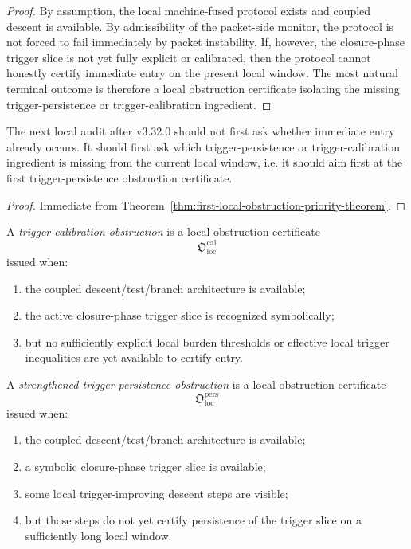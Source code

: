 \begin{proof}
By assumption, the local machine-fused protocol exists and coupled descent is available.
By admissibility of the packet-side monitor, the protocol is not forced to fail immediately by packet instability.
If, however, the closure-phase trigger slice is not yet fully explicit or calibrated, then the protocol cannot honestly certify immediate entry on the present local window.
The most natural terminal outcome is therefore a local obstruction certificate isolating the missing trigger-persistence or trigger-calibration ingredient.
\end{proof}

\begin{corollary}
\label{cor:first-post-v3320-local-audit-rule}
The next local audit after v3.32.0 should not first ask whether immediate entry already occurs.
It should first ask which trigger-persistence or trigger-calibration ingredient is missing from the current local window, i.e. it should aim first at the first trigger-persistence obstruction certificate.
\end{corollary}

\begin{proof}
Immediate from Theorem~\ref{thm:first-local-obstruction-priority-theorem}.
\end{proof}


\begin{definition}
\label{def:trigger-calibration-obstruction}
A \emph{trigger-calibration obstruction} is a local obstruction certificate
\[
\mathfrak{O}_{\mathrm{loc}}^{\mathrm{cal}}
\]
issued when:
\begin{enumerate}
    \item the coupled descent/test/branch architecture is available;
    \item the active closure-phase trigger slice is recognized symbolically;
    \item but no sufficiently explicit local burden thresholds or effective local trigger inequalities are yet available to certify entry.
\end{enumerate}
\end{definition}

\begin{definition}
\label{def:trigger-persistence-obstruction-strengthened-reading}
A \emph{strengthened trigger-persistence obstruction} is a local obstruction certificate
\[
\mathfrak{O}_{\mathrm{loc}}^{\mathrm{pers}}
\]
issued when:
\begin{enumerate}
    \item the coupled descent/test/branch architecture is available;
    \item a symbolic closure-phase trigger slice is available;
    \item some local trigger-improving descent steps are visible;
    \item but those steps do not yet certify persistence of the trigger slice on a sufficiently long local window.
\end{enumerate}
\end{definition}

